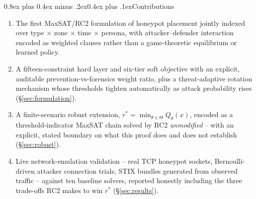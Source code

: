 \documentclass[10pt,twocolumn]{article}
\makeatletter
\renewcommand{\subsection}{\@startsection{subsection}{2}{0pt}%
  {0.8ex plus 0.4ex minus .2ex}{0.4ex plus .1ex}{\normalfont\bfseries}}
\makeatother
\begin{document}
\subsection{Contributions}
\begin{enumerate}[leftmargin=1.1em,itemsep=1pt]
\item[\textbf{C1}] The first MaxSAT/RC2 formulation of honeypot placement jointly indexed over type $\times$ zone $\times$ time $\times$ persona, with attacker--defender interaction encoded as weighted clauses rather than a game-theoretic equilibrium or learned policy.
\item[\textbf{C2}] A fifteen-constraint hard layer and six-tier soft objective with an explicit, auditable prevention-vs-forensics weight ratio, plus a threat-adaptive rotation mechanism whose thresholds tighten automatically as attack probability rises (\S\ref{sec:formulation}).
\item[\textbf{C3}] A finite-scenario robust extension, $r^*=\min_{\theta\in\Theta}Q_\theta(x)$, encoded as a threshold-indicator MaxSAT chain solved by RC2 \emph{unmodified} -- with an explicit, stated boundary on what this proof does and does not establish (\S\ref{sec:robust}).
\item[\textbf{C4}] Live network-emulation validation -- real TCP honeypot sockets, Bernoulli-driven attacker connection trials, STIX bundles generated from observed traffic -- against ten baseline solvers, reported honestly including the three trade-offs RC2 makes to win $r^*$ (\S\ref{sec:results}).
\end{enumerate}
\end{document}
